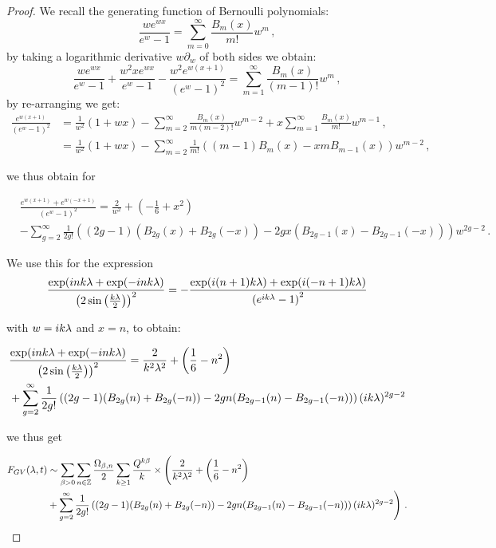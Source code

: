 \documentclass[a4paper,12pt,justification=centering]{article}
\numberwithin{equation}{section}
\newcommand{\ii}{\textnormal{i}}
\theoremstyle{plain}%
\theoremstyle{definition}
\begin{document}
\begin{proof}
We recall the generating function of Bernoulli polynomials:
\begin{equation}
\frac{w e^{w x}}{ e^w-1} = \sum_{m=0}^{\infty} \frac{B_m(x)}{m!} w^m \,, 
\end{equation}
by taking a logarithmic derivative $w\partial_w$ of both sides we obtain:
\begin{equation}
\frac{w e^{wx}}{ e^w-1}+ \frac{w^2 x e^{w x}}{ e^w-1}-\frac{w^2  e^{w(x+1)}}{ (e^w-1)^2} = \sum_{m=1}^{\infty} \frac{B_m(x)}{(m-1)!} w^m \,, 
\end{equation}
by re-arranging we get:
\begin{align}
\frac{e^{w(x+1)}}{ (e^w-1)^2} &= \frac{1}{w^2}(1+w x)- \sum_{m=2}^{\infty} \frac{B_m(x)}{m (m-2)!} w^{m-2}+  x \sum_{m=1}^{\infty} \frac{B_m(x)}{m!} w^{m-1} \,,\nonumber\\
&= \frac{1}{w^2}(1+w x)- \sum_{m=2}^{\infty} \frac{1}{m!} \left( (m-1) B_m(x)- x m B_{m-1}(x)\right)  w^{m-2}\,, 
\end{align}

we thus obtain for 

\begin{align}\label{eq:symBern}
&\frac{e^{w(x+1)}+e^{w(-x+1)}}{ (e^w-1)^2} = \frac{2}{w^2}+ \left( -\frac{1}{6}+x^2\right)  \nonumber \\ 
&- \sum_{g=2}^{\infty}  \frac{1}{2g!} \left(  (2g-1) (B_{2g}(x)+B_{2g}(-x))- 2g x (B_{2g-1}(x)-B_{2g-1}(-x))\right)  w^{2g-2}\,.
\end{align}

We use this for the expression
$$\frac{ \exp(\ii  n k\lambda+ \exp(-\ii  n k\lambda)}{{\left( 2 \sin \left( \frac{k\lambda}{2}\right)\right)^{2}}} =- \frac{ \exp(\ii  (n+1) k\lambda)+\exp(\ii  (-n+1) k\lambda)}{{\left(  e^{i k\lambda}-1\right)^{2}}} $$

 with $w=\ii k \lambda$ and $x=n$, to obtain:

\begin{align}  \label{eq:asymptBern}
&\frac{ \exp(\ii  n k\lambda+ \exp(-\ii  n k\lambda)}{{\left( 2 \sin \left( \frac{k\lambda}{2}\right)\right)^{2}}}=  \frac{2}{k^2 \lambda^2}+ \left( \frac{1}{6}-n^2\right) \nonumber\\
 & +\sum_{g=2}^{\infty}  \frac{1}{2g!} \left(  (2g-1) (B_{2g}(n)+B_{2g}(-n))-2g n (B_{2g-1}(n)-B_{2g-1}(-n))\right)  (\ii k \lambda)^{2g-2}
 \end{align}
 
we thus get

\begin{align}\label{eq:FGVasmpt}
F_{GV}(\lambda,t) &\sim 
  \sum_{\beta>0} \sum_{n \in \mathbb{Z}} \frac{\Omega_{\beta,n}}{2}   \sum_{k\ge 1}   \frac{Q^{k\beta}}{k}  \times \Bigg( \frac{2}{k^2 \lambda^2}+ \left( \frac{1}{6}-n^2\right) \nonumber\\
 & +\sum_{g=2}^{\infty}  \frac{1}{2g!} \left( (2g-1) (B_{2g}(n)+B_{2g}(-n))- 2g n (B_{2g-1}(n)-B_{2g-1}(-n))\right)  (\ii k \lambda)^{2g-2} \Bigg) \,   \,.
\end{align}


\end{proof}
\end{document}
